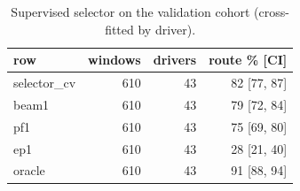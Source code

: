 \begin{table}[H]\centering\scriptsize\setlength{\tabcolsep}{3pt}
\caption{Supervised selector on the validation cohort (cross-fitted by driver).}\label{tab:supp_agent_sel}
\begin{tabular}{lrrr}\toprule
row & windows & drivers & route \% [CI] \\\midrule
selector\_cv & 610 & 43 & 82 [77, 87] \\
beam1 & 610 & 43 & 79 [72, 84] \\
pf1 & 610 & 43 & 75 [69, 80] \\
ep1 & 610 & 43 & 28 [21, 40] \\
oracle & 610 & 43 & 91 [88, 94] \\
\bottomrule\end{tabular}
\end{table}
